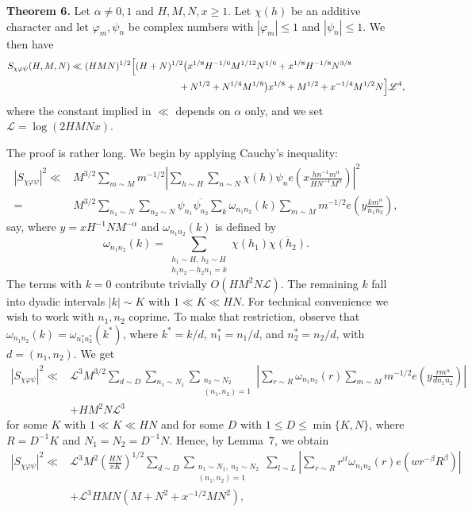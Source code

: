 \documentclass[10pt]{article}
\begin{document}
\medskip
\noindent\textbf{Theorem 6.}
Let $\alpha\ne0,1$ and $H,M,N,x\ge1$. Let $\chi(h)$ be an additive
character and let $\varphi_m,\psi_n$ be complex numbers with
$|\varphi_m|\le1$ and $|\psi_n|\le1$. We then have
\[
\begin{aligned}
S_{\chi\varphi\psi}(H,M,N)\ll{}&(HMN)^{1/2}
 \Bigl[(H+N)^{1/2}
 \bigl(x^{1/8}H^{-1/6}M^{1/12}N^{1/6}
      +x^{1/8}H^{-1/8}N^{3/8}\\
&\hspace{10em}{}+N^{1/2}+N^{1/4}M^{1/8}\bigr)x^{1/8}
 +M^{1/2}+x^{-1/4}M^{1/2}N\Bigr]\mathscr L^4,
\end{aligned}
\]
where the constant implied in $\ll$ depends on $\alpha$ only, and we set
$\mathscr L=\log(2HMNx)$.

The proof is rather long. We begin by applying Cauchy's inequality:
\[
\begin{aligned}
|S_{\chi\varphi\psi}|^2\ll{}&M^{3/2}\sum_{m\sim M}m^{-1/2}
 \left|\sum_{h\sim H}\sum_{n\sim N}\chi(h)\psi_n
 e\left(x\frac{h n^{-1}m^\alpha}{H N^{-1}M^\alpha}\right)\right|^2\\
={}&M^{3/2}\sum_{n_1\sim N}\sum_{n_2\sim N}
 \psi_{n_1}\overline{\psi_{n_2}}\sum_k\omega_{n_1n_2}(k)
 \sum_{m\sim M}m^{-1/2}e\left(y\frac{k m^\alpha}{n_1n_2}\right),
\end{aligned}
\]
say, where $y=xH^{-1}NM^{-\alpha}$ and $\omega_{n_1n_2}(k)$ is defined by
\[
\omega_{n_1n_2}(k)
 =\sum_{\substack{h_1\sim H,\ h_2\sim H\\h_1n_2-h_2n_1=k}}
  \chi(h_1)\overline{\chi(h_2)}.
\]
The terms with $k=0$ contribute trivially $O(HM^2N\mathscr L)$. The
remaining $k$ fall into dyadic intervals $|k|\sim K$ with
$1\ll K\ll HN$. For technical convenience we wish to work with $n_1,n_2$
coprime. To make that restriction, observe that
$\omega_{n_1n_2}(k)=\omega_{n_1^*n_2^*}(k^*)$, where
$k^*=k/d$, $n_1^*=n_1/d$, and $n_2^*=n_2/d$, with $d=(n_1,n_2)$.
We get
\[
\begin{aligned}
|S_{\chi\varphi\psi}|^2\ll{}&\mathscr L^3M^{3/2}
 \sum_{d\sim D}\sum_{n_1\sim N_1}
 \sum_{\substack{n_2\sim N_2\\(n_1,n_2)=1}}
 \left|\sum_{r\sim R}\omega_{n_1n_2}(r)
 \sum_{m\sim M}m^{-1/2}
 e\left(y\frac{r m^\alpha}{d n_1n_2}\right)\right|\\
&+HM^2N\mathscr L^3
\end{aligned}
\]
for some $K$ with $1\ll K\ll HN$ and for some $D$ with
$1\le D\le\min\{K,N\}$, where $R=D^{-1}K$ and
$N_1=N_2=D^{-1}N$. Hence, by Lemma~7, we obtain
\begin{equation*}
\begin{aligned}
|S_{\chi\varphi\psi}|^2\ll{}&\mathscr L^3M^2
 \left(\frac{HN}{xK}\right)^{1/2}
 \sum_{d\sim D}\sum_{\substack{n_1\sim N_1,\ n_2\sim N_2\\(n_1,n_2)=1}}
 \sum_{l\sim L}
 \left|\sum_{r\sim R}r^{it}\omega_{n_1n_2}(r)
 e\left(wr^{-\beta}R^\beta\right)\right|\\
&+\mathscr L^3HMN\left(M+N^2+x^{-1/2}MN^2\right),
\end{aligned}
\tag{6.1}
\end{equation*}
\end{document}
